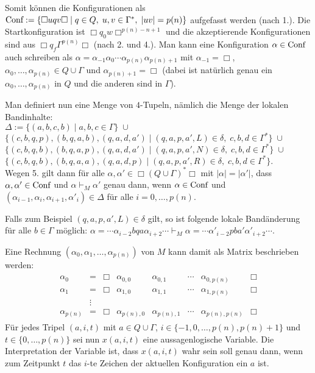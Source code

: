 \begin{Beweis}
    Somit können die Konfigurationen als
    $\text{Conf} := \{\Box uqv \Box \;|\; q \in Q,\; u, v \in \Gamma^\ast,\; |uv| = p(n)\}$
    aufgefasst werden (nach 1.).
    Die Startkonfiguration ist $\Box q_0 w \Box^{p(n)-n+1}$
    und die akzeptierende Konfigurationen sind aus $\Box q_f \Gamma^{p(n)} \Box$
    (nach 2. und 4.).
    Man kann eine Konfiguration $\alpha \in \text{Conf}$ auch schreiben als
    $\alpha = \alpha_{-1} \alpha_{0} \dotsb \alpha_{p(n)} \alpha_{p(n)+1}$
    mit $\alpha_{-1} = \Box$, $\alpha_{0}, \dotsc, \alpha_{p(n)} \in Q \cup \Gamma$ und
    $\alpha_{p(n)+1} = \Box$
    (dabei ist natürlich genau ein $\alpha_{0}, \dotsc, \alpha_{p(n)}$
    in $Q$ und die anderen sind in $\Gamma$).
    
    Man definiert nun eine Menge von $4$-Tupeln, nämlich die Menge der lokalen Bandinhalte:\\
    $\Delta := \{(a, b, c, b) \;|\; a, b, c \in \Gamma\} \;\cup$\\
    $\{(c, b, q, p), (b, q, a, b), (q, a, d, a') \;|\; (q, a, p, a', L) \in \delta,\;
    c, b, d \in \Gamma^\ast\} \;\cup$\\
    $\{(c, b, q, b), (b, q, a, p), (q, a, d, a') \;|\; (q, a, p, a', N) \in \delta,\;
    c, b, d \in \Gamma^\ast\} \;\cup$\\
    $\{(c, b, q, b), (b, q, a, a), (q, a, d, p) \;|\; (q, a, p, a', R) \in \delta,\;
    c, b, d \in \Gamma^\ast\}$.\\
    Wegen 5. gilt dann für alle $\alpha, \alpha' \in \Box (Q \cup \Gamma)^\ast \Box$ mit
    $|\alpha| = |\alpha'|$,
    dass $\alpha, \alpha' \in \text{Conf}$ und $\alpha \vdash_M \alpha'$ genau dann, wenn
    $\alpha \in \text{Conf}$ und
    $(\alpha_{i-1}, \alpha_{i}, \alpha_{i+1}, \alpha'_{i}) \in \Delta$
    für alle $i = 0, \dotsc, p(n)$.
    
    Falls zum Beispiel $(q, a, p, a', L) \in \delta$ gilt, so ist folgende lokale Bandänderung
    für alle $b \in \Gamma$ möglich:
    $\alpha = \dotsb \alpha_{i-2} b q a \alpha_{i+2} \dotsb \vdash_M
    \alpha = \dotsb \alpha'_{i-2} p b a' \alpha'_{i+2} \dotsb$.
    
    Eine Rechnung $(\alpha_0, \alpha_1, \dotsc, \alpha_{p(n)})$ von $M$ kann damit als Matrix
    beschrieben werden:
    \begin{align*}\begin{array}{cccccccc}
        \alpha_0 & = & \Box & \alpha_{0,0} & \alpha_{0,1} & \dotsb & \alpha_{0,p(n)} & \Box\\
        \alpha_1 & = & \Box & \alpha_{1,0} & \alpha_{1,1} & \dotsb & \alpha_{1,p(n)} & \Box\\
        & \vdots\\
        \alpha_{p(n)} & = & \Box & \alpha_{p(n),0} & \alpha_{p(n),1} & \dotsb &
        \alpha_{p(n),p(n)} & \Box
    \end{array}\end{align*}
    Für jedes Tripel $(a, i, t)$ mit $a \in Q \cup \Gamma$,
    $i \in \{-1, 0, \dotsc, p(n), p(n) + 1\}$ und $t \in \{0, \dotsc, p(n)\}$ sei nun
    $x(a, i, t)$ eine aussagenlogische Variable.
    Die Interpretation der Variable ist, dass $x(a, i, t)$ wahr sein soll genau dann, wenn
    zum Zeitpunkt $t$ das $i$-te Zeichen der aktuellen Konfiguration ein $a$ ist.
    

\end{Beweis}

